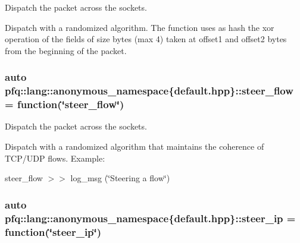 Dispatch the packet across the sockets. 

Dispatch with a randomized algorithm. The function uses as {\ttfamily hash} the xor operation of the fields of {\ttfamily size} bytes (max 4) taken at {\ttfamily offset1} and {\ttfamily offset2} bytes from the beginning of the packet. 
\subsubsection[{\texorpdfstring{steer\+\_\+flow}{steer_flow}}]{\setlength{\rightskip}{0pt plus 5cm}auto pfq\+::lang\+::anonymous\+\_\+namespace\{default.\+hpp\}\+::steer\+\_\+flow = {\bf function}(\char`\"{}steer\+\_\+flow\char`\"{})}\hypertarget{namespacepfq_1_1lang_1_1anonymous__namespace_02default_8hpp_03_adeb44c976ac903e7b13addb65ac41f9f}{}\label{namespacepfq_1_1lang_1_1anonymous__namespace_02default_8hpp_03_adeb44c976ac903e7b13addb65ac41f9f}


Dispatch the packet across the sockets. 

Dispatch with a randomized algorithm that maintains the coherence of T\+C\+P/\+U\+DP flows. Example\+:

steer\+\_\+flow $>$$>$ log\+\_\+msg (\char`\"{}\+Steering a flow\char`\"{}) 
\subsubsection[{\texorpdfstring{steer\+\_\+ip}{steer_ip}}]{\setlength{\rightskip}{0pt plus 5cm}auto pfq\+::lang\+::anonymous\+\_\+namespace\{default.\+hpp\}\+::steer\+\_\+ip = {\bf function}(\char`\"{}steer\+\_\+ip\char`\"{})}\hypertarget{namespacepfq_1_1lang_1_1anonymous__namespace_02default_8hpp_03_afe1c69c555a75021f7e637086cb1264c}{}\label{namespacepfq_1_1lang_1_1anonymous__namespace_02default_8hpp_03_afe1c69c555a75021f7e637086cb1264c}


